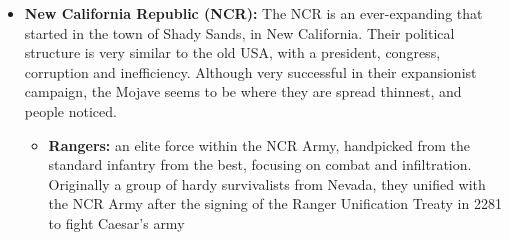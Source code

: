 \documentclass[11pt]{article} %
\begin{document}
\begin{itemize}
	\item \textbf{New California Republic (NCR):} The NCR is an ever-expanding that started in the town of Shady Sands, in New California. Their political structure is very similar to the old USA, with a president, congress, corruption and inefficiency. Although very successful in their expansionist campaign, the Mojave seems to be where they are spread thinnest, and people noticed. 
	\begin{itemize}
		\item \textbf{Rangers:} an elite force within the NCR Army, handpicked from the standard infantry from the best, focusing on combat and infiltration. Originally a group of hardy survivalists from Nevada, they unified with the NCR Army after the signing of the Ranger Unification Treaty in 2281 to fight Caesar's army
	\end{itemize}


\end{itemize}
\end{document}
